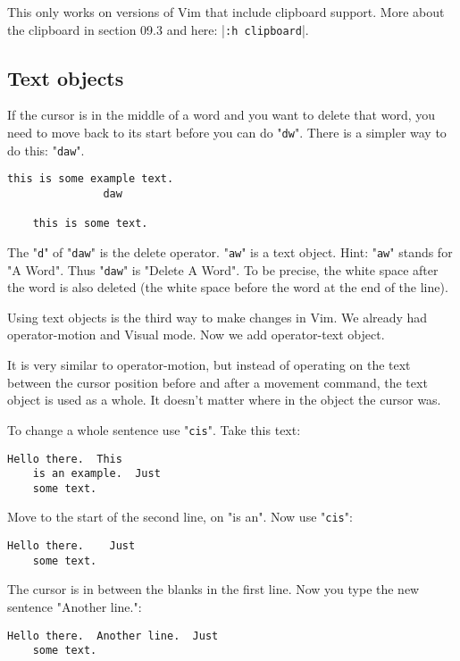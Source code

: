 This only works on versions of Vim that include clipboard support.
More about the clipboard in section 09.3 and here: |\verb!:h clipboard!|.

\subsection{Text objects}

If the cursor is in the middle of a word and you want to delete that word, you need to move back to its start before you can do "\verb!dw!".
There is a simpler way to do this: "\verb!daw!".

\begin{Verbatim}[samepage=true]
    this is some example text. 
               daw

    this is some text. 
\end{Verbatim}

The "\verb!d!" of "\verb!daw!" is the delete operator.
"\verb!aw!" is a text object.
Hint: "\verb!aw!" stands for "A Word".
Thus "\verb!daw!" is "Delete A Word".
To be precise, the white space after the word is also deleted (the white space before the word at the end of the line).

Using text objects is the third way to make changes in Vim.
We already had operator-motion and Visual mode.
Now we add operator-text object.

It is very similar to operator-motion, but instead of operating on the text between the cursor position before and after a movement command, the text object is used as a whole.
It doesn't matter where in the object the cursor was.

To change a whole sentence use "\verb!cis!".
Take this text:

\begin{Verbatim}[samepage=true]
    Hello there.  This 
    is an example.  Just 
    some text. 
\end{Verbatim}

Move to the start of the second line, on "is an".
Now use "\verb!cis!":

\begin{Verbatim}[samepage=true]
    Hello there.    Just 
    some text. 
\end{Verbatim}

The cursor is in between the blanks in the first line.
Now you type the new sentence "Another line.":

\begin{Verbatim}[samepage=true]
    Hello there.  Another line.  Just 
    some text. 
\end{Verbatim}

